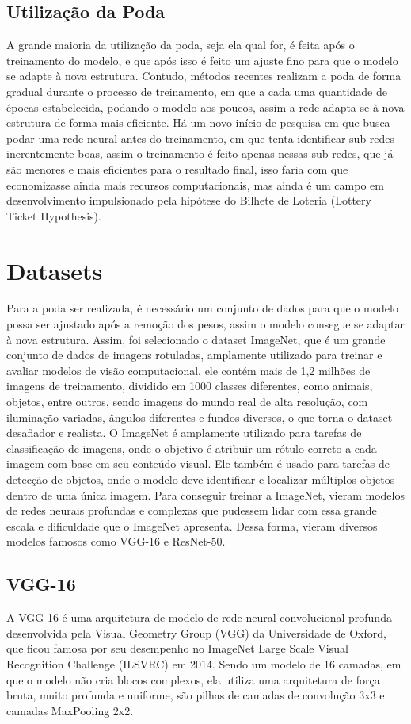 \subsection{Utilização da Poda}
A grande maioria da utilização da poda, seja ela qual for, é feita após o treinamento do modelo, e que após isso é feito um ajuste fino para que o modelo se adapte à nova estrutura.
Contudo, métodos recentes realizam a poda de forma gradual durante o processo de treinamento, em que a cada uma quantidade de épocas estabelecida, podando o modelo aos poucos, assim a rede adapta-se à nova estrutura de forma mais eficiente.
Há um novo início de pesquisa em que busca podar uma rede neural antes do treinamento, em que tenta identificar sub-redes inerentemente boas, assim o treinamento é feito apenas nessas sub-redes, que já são menores e mais eficientes para o resultado final, isso faria com que economizasse ainda mais recursos computacionais, mas ainda é um campo em desenvolvimento impulsionado pela hipótese do Bilhete de Loteria (Lottery Ticket Hypothesis).

\section{Datasets}
Para a poda ser realizada, é necessário um conjunto de dados para que o modelo possa ser ajustado após a remoção dos pesos, assim o modelo consegue se adaptar à nova estrutura. Assim, foi selecionado o dataset ImageNet, que é um grande conjunto de dados de imagens rotuladas, amplamente utilizado para treinar e avaliar modelos de visão computacional, ele contém mais de 1,2 milhões de imagens de treinamento, dividido em 1000 classes diferentes, como animais, objetos, entre outros, sendo imagens do mundo real de alta resolução, com iluminação variadas, ângulos diferentes e fundos diversos, o que torna o dataset desafiador e realista.
O ImageNet é amplamente utilizado para tarefas de classificação de imagens, onde o objetivo é atribuir um rótulo correto a cada imagem com base em seu conteúdo visual. Ele também é usado para tarefas de detecção de objetos, onde o modelo deve identificar e localizar múltiplos objetos dentro de uma única imagem.
Para conseguir treinar a ImageNet, vieram modelos de redes neurais profundas e complexas que pudessem lidar com essa grande escala e dificuldade que o ImageNet apresenta.
Dessa forma, vieram diversos modelos famosos como VGG-16 e ResNet-50.
\subsection{VGG-16}
A VGG-16 é uma arquitetura de modelo de rede neural convolucional profunda desenvolvida pela Visual Geometry Group (VGG) da Universidade de Oxford, que ficou famosa por seu desempenho no ImageNet Large Scale Visual Recognition Challenge (ILSVRC) em 2014.
Sendo um modelo de 16 camadas, em que o modelo não cria blocos complexos, ela utiliza uma arquitetura de força bruta, muito profunda e uniforme, são pilhas de camadas de convolução 3x3 e camadas MaxPooling 2x2.
